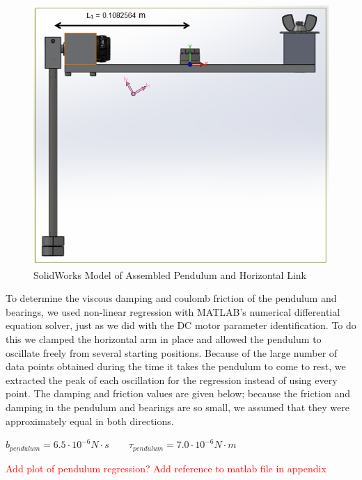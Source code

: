 \documentclass{article}
\newcommand{\xxx}[1]{\textcolor{red}{#1}}
\theoremstyle{plain}
\theoremstyle{definition}
\theoremstyle{remark}
\begin{document}
\begin{figure}[htb]
\begin{center}
\includegraphics[width = 14cm]{CompleteArm.png}
\caption{SolidWorks Model of Assembled Pendulum and Horizontal Link}
\label{q2_5}
\end{center}
\end{figure}

To determine the viscous damping and coulomb friction of the pendulum and bearings, we used non-linear regression with MATLAB's numerical differential equation solver, just as we did with the DC motor parameter identification. To do this we clamped the horizontal arm in place and allowed the pendulum to oscillate freely from several starting positions. Because of the large number of data points obtained during the time it takes the pendulum to come to rest, we extracted the peak of each oscillation for the regression instead of using every point. The damping and friction values are given below; because the friction and damping in the pendulum and bearings are so small, we assumed that they were approximately equal in both directions.\\
\begin{center}
$b_{pendulum} = 6.5\cdot10^{-6}N\cdot s \qquad \tau_{pendulum} = 7.0\cdot10^{-6}N\cdot m$
\end{center}

\xxx{Add plot of pendulum regression? Add reference to matlab file in appendix}
\end{document}
